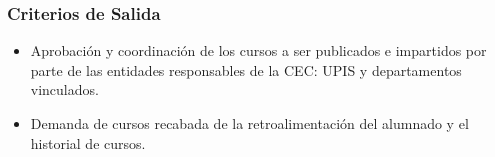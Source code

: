 \subsubsection{Criterios de Salida}			%

\begin{itemize}						%
           \item Aprobación y coordinación de los cursos a ser publicados e impartidos por parte de las entidades responsables de la CEC: UPIS y departamentos vinculados.
           \item Demanda de cursos recabada de la retroalimentación del alumnado y el historial de cursos.
\end{itemize}